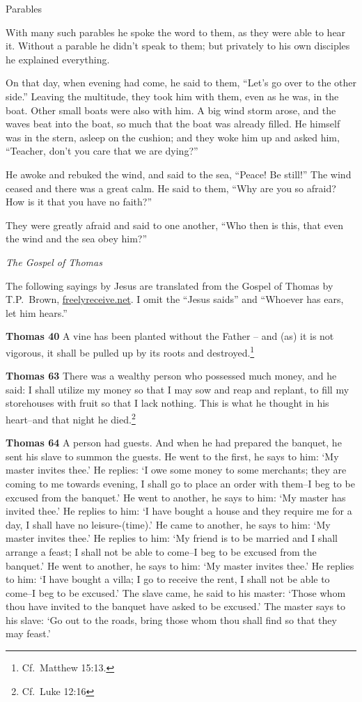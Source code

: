 \documentclass[10pt,twoside]{book}
\newcommand{\quotesize}{\normalsize{}}
\newcommand{\comm}[1]{\begingroup \color{black!50} #1\endgroup}
\newenvironment{quotetext}{\begingroup\quotesize}{\endgroup}
\newcommand{\bible}[2]{\begin{quotetext}\textbf{#1} #2\end{quotetext}}
\newcommand{\thomas}[2]{\bible{Thomas #1}{#2}}
\newcommand{\subhead}[1]{\emph{#1}\par}
\begin{document}
\begin{section}{Parables}
{  With many such parables he spoke the word to them, as they were able to hear it.   Without a parable he didn't speak to them; but privately to his own disciples he explained everything.

  On that day, when evening had come, he said to them, ``Let's go over to the other side.''   Leaving the multitude, they took him with them, even as he was, in the boat. Other small boats were also with him.   A big wind storm arose, and the waves beat into the boat, so much that the boat was already filled.   He himself was in the stern, asleep on the cushion; and they woke him up and asked him, ``Teacher, don't you care that we are dying?''

  He awoke and rebuked the wind, and said to the sea, ``Peace! Be still!'' The wind ceased and there was a great calm.   He said to them, ``Why are you so afraid? How is it that you have no faith?''

  They were greatly afraid and said to one another, ``Who then is this, that even the wind and the sea obey him?'' 
}

\subhead{The Gospel of Thomas}

\comm{The following sayings by Jesus are translated from the Gospel of Thomas by T.P.~Brown, \url{freelyreceive.net}. I omit the ``Jesus saids''
and ``Whoever has ears, let him hears.''}


\thomas{40}{
A vine has been planted without the Father -- and (as) it is not vigorous, it shall be pulled up by its roots and destroyed.\footnote{Cf.~Matthew 15:13.}
}

\thomas{63}{
There was a wealthy person who possessed much money, and he said: I shall utilize my money so that I may sow and reap and replant, to fill my storehouses with fruit so that I lack nothing. This is what he thought in his heart--and that night he died.\footnote{Cf.~Luke 12:16}
}

\thomas{64}{
A person had guests. And when he had prepared the banquet, he sent his slave to summon the guests. He went to the first, he says to him: `My master invites thee.' He replies: `I owe some money to some merchants; they are coming to me towards evening, I shall go to place an order with them--I beg to be excused from the banquet.' He went to another, he says to him: `My master has invited thee.' He replies to him: `I have bought a house and they require me for a day, I shall have no leisure-(time).' He came to another, he says to him: `My master invites thee.' He replies to him: `My friend is to be married and I shall arrange a feast; I shall not be able to come--I beg to be excused from the banquet.' He went to another, he says to him: `My master invites thee.' He replies to him: `I have bought a villa; I go to receive the rent, I shall not be able to come--I beg to be excused.' The slave came, he said to his master: `Those whom thou have invited to the banquet have asked to be excused.' The master says to his slave: `Go out to the roads, bring those whom thou shall find so that they may feast.'
}


\end{section}
\end{document}
